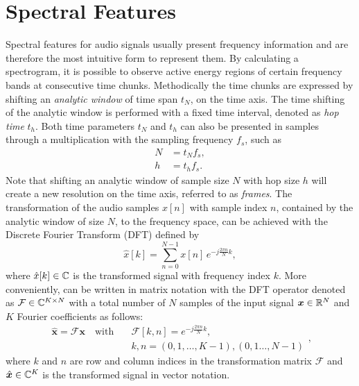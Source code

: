 
\section{Spectral Features}\label{sec:signal_spec}
Spectral features for audio signals usually present frequency information and are therefore the most intuitive form to represent them.
By calculating a spectrogram, it is possible to observe active energy regions of certain frequency bands at consecutive time chunks.
Methodically the time chunks are expressed by shifting an \emph{analytic window} of time span $t_N$, on the time axis.
The time shifting of the analytic window is performed with a fixed time interval, denoted as \emph{hop time} $t_{h}$.
Both time parameters $t_N$ and $t_h$ can also be presented in samples through a multiplication with the sampling frequency $f_s$, such as
\begin{equation}
  \begin{split}
    N &= t_N f_s, \\
    h &= t_h f_s.
  \end{split}
\end{equation}
Note that shifting an analytic window of sample size $N$ with hop size $h$ will create a new resolution on the time axis, referred to as \emph{frames}.
The transformation of the audio samples $x[n]$ with sample index $n$, contained by the analytic window of size $N$, to the frequency space, can be achieved with the Discrete Fourier Transform (DFT) defined by
\begin{equation}\label{eq:signal_spec_dtft}
  \hat{x}[k] = \sum_{n=0}^{N-1} x[n] \, e^{-j\frac{2 \pi n}{N}k},
\end{equation}
where $\hat{x}[k] \in \mathbb{C}$ is the transformed signal with frequency index $k$.
More conveniently,  can be written in matrix notation with the DFT operator denoted as $\mathcal{F} \in \mathbb{C}^{K \times N}$ with a total number of $N$ samples of the input signal $\bm{x} \in \mathbb{R}^N$ and $K$ Fourier coefficients as follows:
\begin{equation}\label{eq:signal_spec_dtft_matrix}
  \begin{aligned}
    \hat{\bm{x}} = \mathcal{F} \bm{x} \quad \mathrm{with} 
    \quad &\mathcal{F}[k, n] = e^{-j\frac{2 \pi n}{N} k},\\
    &k, n = (0, 1, \dots, K-1), (0, 1 \dots, N-1)
  \end{aligned},
\end{equation}
where $k$ and $n$ are row and column indices in the transformation matrix $\mathcal{F}$ and $\hat{\bm{x}} \in \mathbb{C}^K$ is the transformed signal in vector notation.

